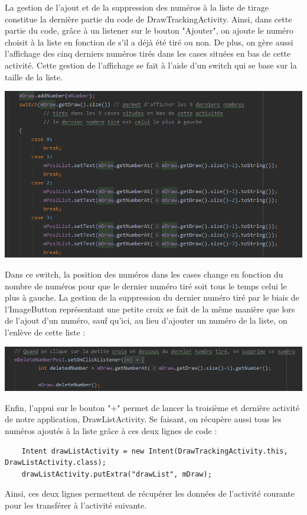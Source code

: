 \documentclass{article}
\begin{document}
\vspace{1em}
La gestion de l'ajout et de la suppression des numéros à la liste de tirage constitue la dernière partie du code de DrawTrackingActivity. Ainsi, dans cette partie du code, grâce à un listener sur le bouton "Ajouter", on ajoute le numéro choisit à la liste en fonction de s'il a déjà été tiré ou non. De plus, on gère aussi l'affichage des cinq derniers numéros tirés dans les cases situées en bas de cette activité. Cette gestion de l'affichage se fait à l'aide d'un switch qui se base sur la taille de la liste.
\newpage
\begin{center} \includegraphics[]{switch_DrawTrackingActivity.png} \end{center}
Dans ce switch, la position des numéros dans les cases change en fonction du nombre de numéros pour que le dernier numéro tiré soit tous le temps celui le plus à gauche.
\vspace{1em}
\newline La gestion de la suppression du dernier numéro tiré par le biais de l'ImageButton représentant une petite croix se fait de la même manière que lors de l'ajout d'un numéro, sauf qu'ici, au lieu d'ajouter un numéro de la liste, on l'enlève de cette liste :
\newline
\begin{center} \includegraphics[]{delete_DrawTrackingActivity.png} \end{center}
\vspace{1em}
Enfin, l'appui sur le bouton "+" permet de lancer la troisième et dernière activité de notre application, DrawListActivity. Se faisant, on récupère aussi tous les numéros ajoutés à la liste grâce à ces deux lignes de code : 
\begin{lstlisting}
    Intent drawListActivity = new Intent(DrawTrackingActivity.this, DrawListActivity.class);
    drawListActivity.putExtra("drawList", mDraw);
\end{lstlisting}
Ainsi, ces deux lignes permettent de récupérer les données de l'activité courante pour les transférer à l'activité suivante.
\end{document}
